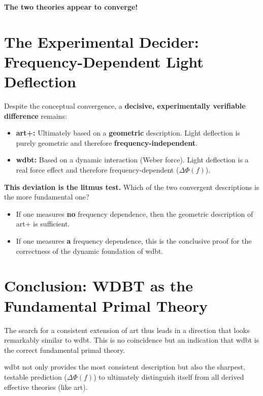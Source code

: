 \textbf{The two theories appear to converge!}

\section{The Experimental Decider: Frequency-Dependent Light Deflection}
Despite the conceptual convergence, a \textbf{decisive, experimentally verifiable difference} remains:

\begin{itemize}
    \item \textbf{\gls{art}+:} Ultimately based on a \textbf{geometric} description. Light deflection is purely geometric and therefore \textbf{frequency-independent}.
    \item \textbf{\gls{wdbt}:} Based on a dynamic interaction (Weber force). Light deflection is a real force effect and therefore frequency-dependent ($\Delta \Phi(f)$).
\end{itemize}

\textbf{This deviation is the litmus test.} Which of the two convergent descriptions is the more fundamental one?

\begin{itemize}
    \item If one measures \textbf{no} frequency dependence, then the geometric description of \gls{art}+ is sufficient.
    \item If one measures \textbf{a} frequency dependence, this is the conclusive proof for the correctness of the dynamic foundation of \gls{wdbt}.
\end{itemize}

\section{Conclusion: WDBT as the Fundamental Primal Theory}
The search for a consistent extension of \gls{art} thus leads in a direction that looks remarkably similar to \gls{wdbt}. This is no coincidence but an indication that \gls{wdbt}
is the correct fundamental primal theory.

\gls{wdbt} not only provides the most consistent description but also the sharpest, testable prediction ($\Delta \Phi(f)$) to ultimately distinguish itself from all derived effective
theories (like \gls{art}).